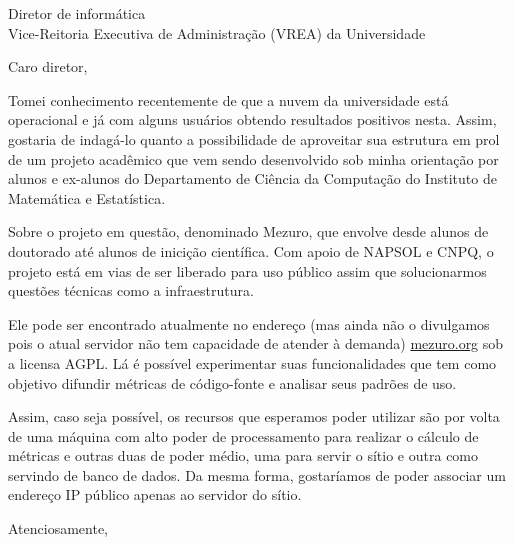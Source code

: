 \documentclass[a4paper,11pt]{letter}
\begin{document}
\begin{letter}{ Diretor de informática \\ Vice-Reitoria Executiva de Administração (VREA) da Universidade }

\opening{ Caro diretor, }

Tomei conhecimento recentemente de que a nuvem da universidade está operacional e já com alguns usuários obtendo resultados positivos nesta. Assim, gostaria de indagá-lo quanto a possibilidade de aproveitar sua estrutura em prol de um projeto acadêmico que vem sendo desenvolvido sob minha orientação por alunos e ex-alunos do Departamento de Ciência da Computação do Instituto de Matemática e Estatística.

Sobre o projeto em questão, denominado Mezuro, que envolve desde alunos de doutorado até alunos de inicição científica. Com apoio de NAPSOL e CNPQ, o projeto está em vias de ser liberado para uso público assim que solucionarmos questões técnicas como a infraestrutura.

Ele pode ser encontrado atualmente no endereço (mas ainda não o divulgamos pois o atual servidor não tem capacidade de atender à demanda) \url{mezuro.org} sob a licensa AGPL. Lá é possível experimentar suas funcionalidades que tem como objetivo difundir métricas de código-fonte e analisar seus padrões de uso.

Assim, caso seja possível, os recursos que esperamos poder utilizar são por volta de uma máquina com alto poder de processamento para realizar o cálculo de métricas e outras duas de poder médio, uma para servir o sítio e outra como servindo de banco de dados. Da mesma forma, gostaríamos de poder associar um endereço IP público apenas ao servidor do sítio.

\closing{Atenciosamente,}

\end{letter}
\end{document}
